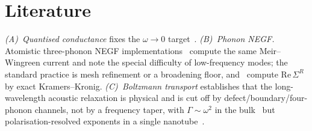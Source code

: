 \section{Literature}
\label{sec:ir_literature}

\emph{(A)~Quantised conductance} fixes the $\omega\to0$
target~\cite{rego_quantized_1998,schwab_measurement_2000,jeong_analysis_2012}.
\emph{(B)~Phonon NEGF.} Atomistic three-phonon NEGF
implementations~\cite{xu_nonequilibrium_2008,guo_anharmonic_interface_2021,polanco_phonon_2023}
compute the same Meir--Wingreen current and note the special difficulty of
low-frequency modes; the standard practice is mesh refinement or a broadening floor,
and~\citet{lemus_modespace_2020} compute $\mathrm{Re}\,\Sigma^R$ by exact
Kramers--Kronig. \emph{(C)~Boltzmann transport} establishes that the long-wavelength
acoustic relaxation is physical and is cut off by defect/boundary/four-phonon
channels, not by a frequency taper, with $\Gamma\sim\omega^2$ in the
bulk~\cite{ma_examining_2014,maznev_demystifying_2014} but polarisation-resolved
exponents in a single nanotube~\cite{bruns_nanotube_2021}.
